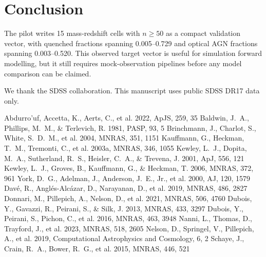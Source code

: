 \documentclass[twocolumn]{aastex631}
\begin{document}
\section{Conclusion}\label{sec:conclusion}
The pilot writes 15 mass-redshift cells with $n \geq 50$ as a compact validation vector, with quenched fractions spanning 0.005--0.729 and optical AGN fractions spanning 0.003--0.520. This observed target vector is useful for simulation forward modelling, but it still requires mock-observation pipelines before any model comparison can be claimed.

\acknowledgments
We thank the SDSS collaboration. This manuscript uses public SDSS DR17 data only.


\begin{thebibliography}{}
 Abdurro'uf, Accetta, K., Aerts, C., et al. 2022, ApJS, 259, 35
 Baldwin, J.~A., Phillips, M.~M., \& Terlevich, R. 1981, PASP, 93, 5
 Brinchmann, J., Charlot, S., White, S.~D.~M., et al. 2004, MNRAS, 351, 1151
 Kauffmann, G., Heckman, T.~M., Tremonti, C., et al. 2003a, MNRAS, 346, 1055
 Kewley, L.~J., Dopita, M.~A., Sutherland, R.~S., Heisler, C.~A., \& Trevena, J. 2001, ApJ, 556, 121
 Kewley, L.~J., Groves, B., Kauffmann, G., \& Heckman, T. 2006, MNRAS, 372, 961
 York, D.~G., Adelman, J., Anderson, J.~E., Jr., et al. 2000, AJ, 120, 1579
 Dav\'e, R., Angl\'es-Alc\'azar, D., Narayanan, D., et al. 2019, MNRAS, 486, 2827
 Donnari, M., Pillepich, A., Nelson, D., et al. 2021, MNRAS, 506, 4760
 Dubois, Y., Gavazzi, R., Peirani, S., \& Silk, J. 2013, MNRAS, 433, 3297
 Dubois, Y., Peirani, S., Pichon, C., et al. 2016, MNRAS, 463, 3948
 Nanni, L., Thomas, D., Trayford, J., et al. 2023, MNRAS, 518, 2605
 Nelson, D., Springel, V., Pillepich, A., et al. 2019, Computational Astrophysics and Cosmology, 6, 2
 Schaye, J., Crain, R.~A., Bower, R.~G., et al. 2015, MNRAS, 446, 521
\end{thebibliography}
\end{document}
